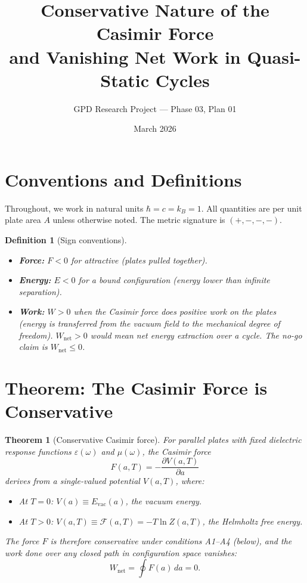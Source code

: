 \documentclass[11pt]{article}
\title{Conservative Nature of the Casimir Force\\and Vanishing Net Work in Quasi-Static Cycles}
\author{GPD Research Project --- Phase 03, Plan 01}
\date{March 2026}
\newtheorem{theorem}{Theorem}
\newtheorem{definition}{Definition}
\begin{document}
\maketitle

\section{Conventions and Definitions}

Throughout, we work in natural units $\hbar = c = k_B = 1$.
All quantities are per unit plate area $A$ unless otherwise noted.
The metric signature is $(+,-,-,-)$.

\begin{definition}[Sign conventions]
\begin{itemize}
  \item \textbf{Force:} $F < 0$ for attractive (plates pulled together).
  \item \textbf{Energy:} $E < 0$ for a bound configuration (energy lower than infinite separation).
  \item \textbf{Work:} $W > 0$ when the Casimir force does positive work on the plates
    (energy is transferred \emph{from} the vacuum field to the mechanical degree of freedom).
    $W_\mathrm{net} > 0$ would mean net energy extraction over a cycle.
    The no-go claim is $W_\mathrm{net} \le 0$.
\end{itemize}
\end{definition}

\section{Theorem: The Casimir Force is Conservative}

\begin{theorem}[Conservative Casimir force]
\label{thm:conservative}
For parallel plates with fixed dielectric response functions
$\varepsilon(\omega)$ and $\mu(\omega)$, the Casimir force
\begin{equation}
  F(a,T) = -\frac{\partial V(a,T)}{\partial a}
  \label{eq:force-potential}
\end{equation}
derives from a single-valued potential $V(a,T)$, where:
\begin{itemize}
  \item At $T = 0$: $V(a) \equiv E_\mathrm{vac}(a)$, the vacuum energy.
  \item At $T > 0$: $V(a,T) \equiv \mathcal{F}(a,T) = -T \ln Z(a,T)$,
    the Helmholtz free energy.
\end{itemize}
The force $F$ is therefore conservative under conditions A1--A4 (below),
and the work done over any closed path in configuration space vanishes:
\begin{equation}
  W_\mathrm{net} = \oint F(a)\, da = 0.
  \label{eq:cycle-vanish}
\end{equation}
\end{theorem}
\end{document}
